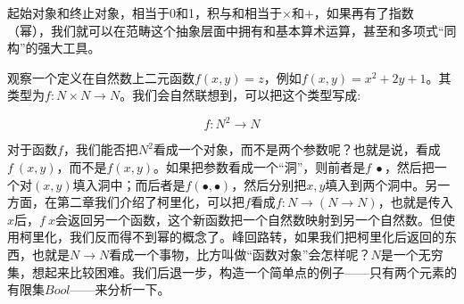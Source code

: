 \documentclass[b5paper]{ctexart}
\begin{document}
起始对象和终止对象，相当于0和1，积与和相当于$\times$和$+$，如果再有了指数（幂），我们就可以在范畴这个抽象层面中拥有和基本算术运算，甚至和多项式“同构”的强大工具。

观察一个定义在自然数上二元函数$f(x, y) = z$，例如$f(x, y) = x^2 + 2y + 1$。其类型为$f: N \times N \to N$。我们会自然联想到，可以把这个类型写成:

\[
f : N^2 \to N
\]

对于函数$f$，我们能否把$N^2$看成一个对象，而不是两个参数呢？也就是说，看成$f\ (x, y)$，而不是$f(x, y)$。如果把参数看成一个“洞”，则前者是$f\ \bullet$，然后把一个对$(x, y)$填入洞中；而后者是$f(\bullet, \bullet)$，然后分别把$x, y$填入到两个洞中。另一方面，在第二章我们介绍了柯里化，可以把$f$看成$f: N \to (N \to N)$，也就是传入$x$后，$f\ x$会返回另一个函数，这个新函数把一个自然数映射到另一个自然数。但使用柯里化，我们反而得不到幂的概念了。峰回路转，如果我们把柯里化后返回的东西，也就是$N \to N$看成一个事物，比方叫做“函数对象”会怎样呢？$N$是一个无穷集，想起来比较困难。我们后退一步，构造一个简单点的例子——只有两个元素的有限集$Bool$——来分析一下。
\end{document}
